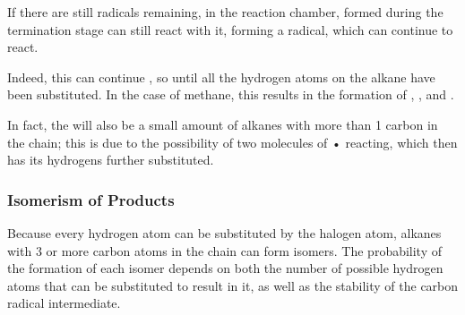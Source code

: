 				If there are still \ch{\Cl} radicals remaining, in the reaction chamber,  formed during the
				termination stage can still react with it, forming a  radical, which can continue to react.


				Indeed, this can continue , so until all the hydrogen atoms on the alkane have been substituted.
				In the case of methane, this results in the formation of , ,  and
				.

				In fact, the will also be a small amount of alkanes with more than 1 carbon in the chain; this is due to the
				possibility of two molecules of • reacting, which then has its hydrogens further substituted.





			\pagebreak
			\subsubsection{Isomerism of Products}

				Because every hydrogen atom can be substituted by the halogen atom, alkanes with 3 or more carbon atoms in the chain
				can form isomers. The probability of the formation of each isomer depends on both the number of possible hydrogen atoms
				that can be substituted to result in it, as well as the stability of the carbon radical intermediate.


